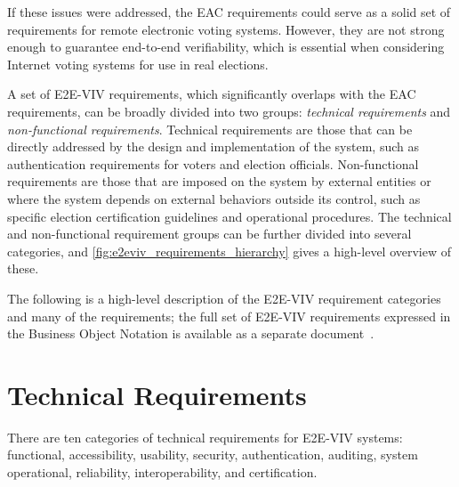 
If these issues were addressed, the EAC requirements could serve as a
solid set of requirements for remote electronic voting
systems. However, they are not strong enough to guarantee end-to-end
verifiability, which is essential when considering Internet voting
systems for use in real elections.  

A set of E2E-VIV requirements, which significantly overlaps with the
EAC requirements, can be broadly divided into two groups:
\emph{technical requirements} and \emph{non-functional
  requirements}. Technical requirements are those that can be directly
addressed by the design and implementation of the system, such as
authentication requirements for voters and election
officials. Non-functional requirements are those that are imposed on
the system by external entities or where the system depends on
external behaviors outside its control, such as specific election
certification guidelines and operational procedures. The technical and
non-functional requirement groups can be further divided into several
categories, and \autoref{fig:e2eviv_requirements_hierarchy} gives a
high-level overview of these.

The following is a high-level description of the E2E-VIV requirement
categories and many of the requirements; the full set of E2E-VIV
requirements expressed in the Business Object Notation is available as
a separate document~\cite{E2EVIVBON}.

\section{Technical Requirements}
There are ten categories of technical requirements for E2E-VIV
systems: functional, accessibility, usability, security,
authentication, auditing, system operational, reliability,
interoperability, and certification. 

\clearpage\break

